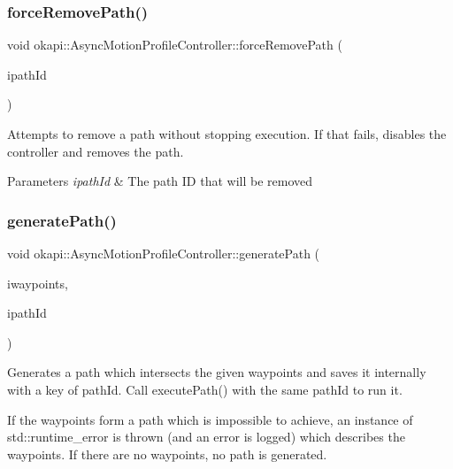 \subsubsection{\texorpdfstring{forceRemovePath()}{forceRemovePath()}}
{\footnotesize\ttfamily void okapi\+::\+Async\+Motion\+Profile\+Controller\+::force\+Remove\+Path (\begin{DoxyParamCaption}\item[{const std\+::string \&}]{ipath\+Id }\end{DoxyParamCaption})}

Attempts to remove a path without stopping execution. If that fails, disables the controller and removes the path.


\begin{DoxyParams}{Parameters}
{\em ipath\+Id} & The path ID that will be removed \\
\hline
\end{DoxyParams}
\mbox{\label{classokapi_1_1AsyncMotionProfileController_a3b8ba2a691bea6f1cf7596f0ecb8b899}} 
\subsubsection{\texorpdfstring{generatePath()}{generatePath()}\hspace{0.1cm}{\footnotesize\ttfamily [1/2]}}
{\footnotesize\ttfamily void okapi\+::\+Async\+Motion\+Profile\+Controller\+::generate\+Path (\begin{DoxyParamCaption}\item[{std\+::initializer\+\_\+list$<$ \mbox{\hyperlink{structokapi_1_1PathfinderPoint}{Pathfinder\+Point}} $>$}]{iwaypoints,  }\item[{const std\+::string \&}]{ipath\+Id }\end{DoxyParamCaption})}

Generates a path which intersects the given waypoints and saves it internally with a key of path\+Id. Call {\ttfamily execute\+Path()} with the same path\+Id to run it.

If the waypoints form a path which is impossible to achieve, an instance of {\ttfamily std\+::runtime\+\_\+error} is thrown (and an error is logged) which describes the waypoints. If there are no waypoints, no path is generated.


